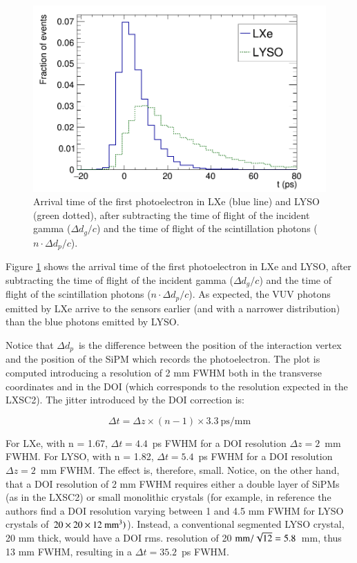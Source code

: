 \documentclass[review]{elsarticle}
\begin{document}
\begin{figure}[!bhtp]
	\centering
	\includegraphics[scale=0.4]{../img/FirstPEScintLXeLYSO.png}
	\caption{\label{fig.firstPE} Arrival time of the first photoelectron in LXe (blue line) and LYSO (green dotted), after subtracting the time of flight of the incident gamma ($\Delta d_g/c$) and the time of flight of the scintillation photons ($n \cdot \Delta d_p/c$). }\label{fig.FirstPE}
\end{figure} 

Figure \ref{fig.FirstPE} shows the arrival time of the first photoelectron in LXe and LYSO, after subtracting the time of flight of the incident gamma ($\Delta d_g/c$) and the time of flight of the scintillation photons ($n \cdot \Delta d_p/c$). As expected, the VUV photons emitted by LXe arrive to the sensors earlier (and with a narrower distribution) than the blue photons emitted by LYSO. 

Notice that $\Delta d_p$~is the difference 
between the position of the interaction vertex and the position of the SiPM which records the photoelectron. 
The plot is computed introducing a resolution of 2 mm FWHM both in the transverse coordinates and
in the DOI (which corresponds to the resolution expected in the LXSC2). The jitter introduced by the DOI correction is:

\begin{equation}
\Delta t =\Delta z \times (n-1) \times 3.3\ \textrm{ps/mm}
\label{eq.DOI}
\end{equation}

For LXe, with n = 1.67, $\Delta t = 4.4$~ps FWHM for a DOI resolution $\Delta z = 2$~mm FWHM. 
For LYSO, with n = 1.82, $\Delta t = 5.4$~ps FWHM for a DOI resolution $\Delta z = 2$~mm FWHM. The effect is, therefore, small. Notice, on the other hand, that a DOI resolution of 2 mm FWHM requires either a double layer of SiPMs (as in the LXSC2) or small monolithic crystals (for example, in reference \cite{VanDamm2011} the authors find a DOI resolution varying between 1 and 4.5 mm FWHM for LYSO crystals of 
$20 \times 20 \times 12 ~{\rm mm^3})$). Instead, a conventional segmented LYSO crystal, 20 mm
thick, would have a DOI rms. resolution of 20 ${\rm mm}/\sqrt{12} = 5.8$~mm, thus 13 mm FWHM, resulting in a $\Delta t = 35.2$~ps FWHM.
\end{document}
